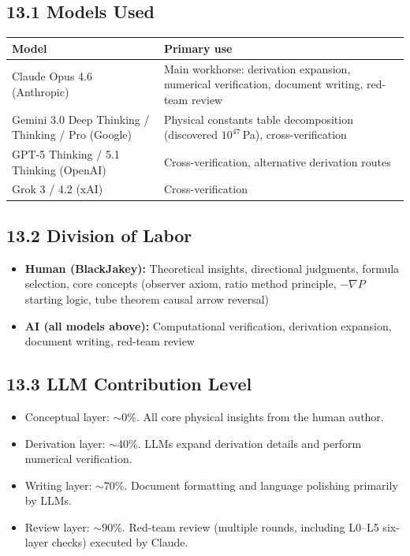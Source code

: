 \documentclass[11pt,a4paper]{article}
\begin{document}
\subsection{13.1 Models Used}

\begin{center}
\begin{tabular}{lp{8cm}}
\toprule
Model & Primary use \\
\midrule
Claude Opus 4.6 (Anthropic) & Main workhorse: derivation expansion, numerical verification, document writing, red-team review \\
Gemini 3.0 Deep Thinking / Thinking / Pro (Google) & Physical constants table decomposition (discovered $10^{47}$\,Pa), cross-verification \\
GPT-5 Thinking / 5.1 Thinking (OpenAI) & Cross-verification, alternative derivation routes \\
Grok 3 / 4.2 (xAI) & Cross-verification \\
\bottomrule
\end{tabular}
\end{center}

\subsection{13.2 Division of Labor}

\begin{itemize}[nosep]
\item \textbf{Human (BlackJakey):} Theoretical insights, directional judgments, formula selection, core concepts (observer axiom, ratio method principle, $-\nabla P$ starting logic, tube theorem causal arrow reversal)
\item \textbf{AI (all models above):} Computational verification, derivation expansion, document writing, red-team review
\end{itemize}

\subsection{13.3 LLM Contribution Level}

\begin{itemize}[nosep]
\item Conceptual layer: $\sim$0\%. All core physical insights from the human author.
\item Derivation layer: $\sim$40\%. LLMs expand derivation details and perform numerical verification.
\item Writing layer: $\sim$70\%. Document formatting and language polishing primarily by LLMs.
\item Review layer: $\sim$90\%. Red-team review (multiple rounds, including L0--L5 six-layer checks) executed by Claude.
\end{itemize}
\end{document}
